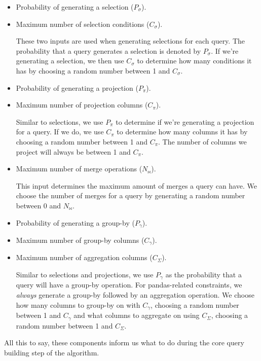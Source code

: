 \documentclass[10pt, twocolumn]{article}
\begin{document}
\begin{itemize}
  \item Probability of generating a selection ($P_{\sigma}$).
  \item Maximum number of selection conditions ($C_{\sigma}$).

  \spacing
  These two inputs are used when generating selections for each query. The probability that a query generates a selection is denoted by $P_{\sigma}$. If we're generating a selection, we then use $C_{\sigma}$ to determine how many conditions it has by choosing a random number between 1 and $C_{\sigma}$.
  \spacing

  \item Probability of generating a projection ($P_{\pi}$).
  \item Maximum number of projection columns ($C_{\pi}$).

  \spacing
  Similar to selections, we use $P_{\pi}$ to determine if we're generating a projection for a query. If we do, we use $C_{\pi}$ to determine how many columns it has by choosing a random number between 1 and $C_{\pi}$. The number of columns we project will always be between 1 and $C_{\pi}$.
  \spacing

  \item Maximum number of merge operations ($N_{\bowtie}$).

  \spacing
  This input determines the maximum amount of merges a query can have. We choose the number of merges for a query by generating a random number between 0 and $N_{\bowtie}$.
  \spacing

  \item Probability of generating a group-by ($P_{\gamma}$).
  \item Maximum number of group-by columns ($C_{\gamma}$).
  \item Maximum number of aggregation columns ($C_{\Sigma}$).

  \spacing
  Similar to selections and projections, we use $P_{\gamma}$ as the probability that a query will have
  a group-by operation. For pandas-related constraints, we \textit{always} generate a group-by followed by an aggregation
  operation. We choose how many columns to group-by on with $C_{\gamma}$, choosing a random number between 1 and $C_{\gamma}$ and
  what columns to aggregate on using $C_{\Sigma}$, choosing a random number between 1 and $C_{\Sigma}$.
\end{itemize}

\noindent
All this to say, these components inform us what to do during the core query building step of the algorithm.
\end{document}
